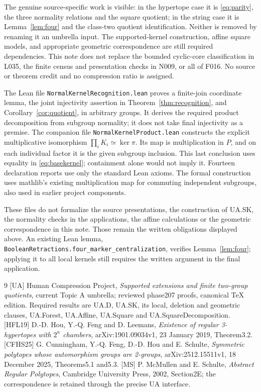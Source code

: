 \documentclass[11pt,a4paper]{article}
\theoremstyle{remark}\newtheorem{remark}[theorem]{Remark}
\begin{document}
The genuine source-specific work is visible: in the hypertope case it is
\eqref{eq:parity}, the three normality relations and the square quotient; in
the string case it is Lemma~\ref{lem:four} and the class-two quotient
identification. Neither is removed by renaming it an umbrella input.
The supported-kernel construction, affine square models, and appropriate
geometric correspondence are still required dependencies. This note does not
replace the bounded cyclic-core classification in L035, the finite census and
presentation checks in N009, or all of F016. No source or theorem credit and no
compression ratio is assigned.

The Lean file \texttt{NormalKernelRecognition.lean} proves a finite-join
coordinate lemma, the joint injectivity assertion in
Theorem~\ref{thm:recognition}, and Corollary~\ref{cor:quotient}, in arbitrary
groups. It derives the required product decomposition from subgroup normality;
it does not take final injectivity as a premise. The companion file
\texttt{NormalKernelProduct.lean} constructs the explicit multiplicative
isomorphism $\prod_i K_i\simeq\ker\pi$. Its map is multiplication in $P$,
and on each individual factor it is the given subgroup inclusion. This last
conclusion uses equality in \eqref{eq:basekernel}; containment alone would
not imply it. Fourteen declaration reports use only the standard Lean axioms.
The formal construction uses mathlib's existing multiplication map for
commuting independent subgroups, also used in earlier project components.

These files do not formalize the source presentations, the construction of
UA.SK, the normality checks in the applications, the affine calculations or
the geometric correspondence in this note. Those remain the written
obligations displayed above. An existing Lean lemma,
\texttt{BooleanRetractions.four\_marker\_centralization}, verifies
Lemma~\ref{lem:four}; applying it to all local kernels still requires the
written argument in the final application.

\begin{thebibliography}{9}
[UA] Human Compression Project, \emph{Supported extensions and finite
two-group quotients}, current Topic A umbrella; reviewed phase207 proofs,
canonical TeX edition. Required results are UA.D, UA.SK, its local, deletion
and geometric clauses, UA.Forest, UA.Affine, UA.Square and
UA.SquareDecomposition.
[HFL19] D.-D. Hou, Y.-Q. Feng and D. Leemans,
\emph{Existence of regular 3-hypertopes with $2^n$ chambers},
arXiv:1901.09034v1, 23 January 2019, Theorem3.2.
[CFHS25] G. Cunningham, Y.-Q. Feng, D.-D. Hou and E. Schulte,
\emph{Symmetric polytopes whose automorphism groups are 2-groups},
arXiv:2512.15511v1, 18 December 2025, Theorems5.1 and5.3.
[MS] P. McMullen and E. Schulte, \emph{Abstract Regular Polytopes},
Cambridge University Press, 2002, Section2E; the correspondence is retained
through the precise UA interface.
\end{thebibliography}
\end{document}
